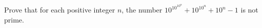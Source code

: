 Prove that for each positive integer $n$, the number
$10^{10^{10^n}} + 10^{10^n} + 10^n - 1$
is not prime.

